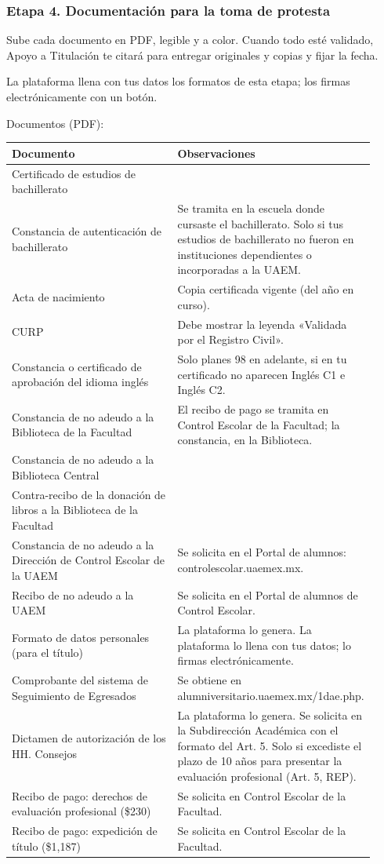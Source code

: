 \subsubsection*{Etapa 4. Documentación para la toma de protesta}
Sube cada documento en PDF, legible y a color. Cuando todo esté validado, Apoyo a Titulación te citará para entregar originales y copias y fijar la fecha.

La plataforma llena con tus datos los formatos de esta etapa; los firmas electrónicamente con un botón.

Documentos (PDF):
{\small\begin{longtable}{>{\raggedright\arraybackslash}p{0.47\linewidth}>{\raggedright\arraybackslash}p{0.45\linewidth}}
\toprule
\textbf{Documento} & \textbf{Observaciones}\\
\midrule
\endhead
Certificado de estudios de bachillerato & \\
Constancia de autenticación de bachillerato & Se tramita en la escuela donde cursaste el bachillerato. Solo si tus estudios de bachillerato no fueron en instituciones dependientes o incorporadas a la UAEM.\\
Acta de nacimiento & Copia certificada vigente (del año en curso).\\
CURP & Debe mostrar la leyenda «Validada por el Registro Civil».\\
Constancia o certificado de aprobación del idioma inglés & Solo planes 98 en adelante, si en tu certificado no aparecen Inglés C1 e Inglés C2.\\
Constancia de no adeudo a la Biblioteca de la Facultad & El recibo de pago se tramita en Control Escolar de la Facultad; la constancia, en la Biblioteca.\\
Constancia de no adeudo a la Biblioteca Central & \\
Contra-recibo de la donación de libros a la Biblioteca de la Facultad & \\
Constancia de no adeudo a la Dirección de Control Escolar de la UAEM & Se solicita en el Portal de alumnos: controlescolar.uaemex.mx.\\
Recibo de no adeudo a la UAEM & Se solicita en el Portal de alumnos de Control Escolar.\\
Formato de datos personales (para el título) & La plataforma lo genera. La plataforma lo llena con tus datos; lo firmas electrónicamente.\\
Comprobante del sistema de Seguimiento de Egresados & Se obtiene en alumniversitario.uaemex.mx/1dae.php.\\
Dictamen de autorización de los HH. Consejos & La plataforma lo genera. Se solicita en la Subdirección Académica con el formato del Art. 5. Solo si excediste el plazo de 10 años para presentar la evaluación profesional (Art. 5, REP).\\
Recibo de pago: derechos de evaluación profesional (\$230) & Se solicita en Control Escolar de la Facultad.\\
Recibo de pago: expedición de título (\$1,187) & Se solicita en Control Escolar de la Facultad.\\
\bottomrule
\end{longtable}}
